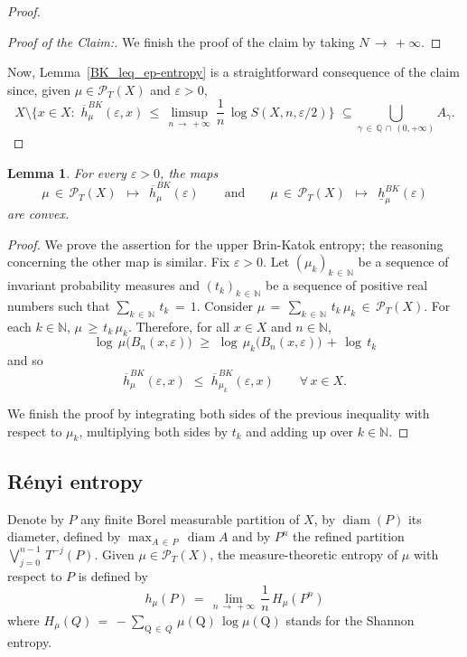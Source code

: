 \documentclass[11pt,a4paper,reqno]{amsart}
\theoremstyle{plain}
\newtheorem{lemma}[theorem]{Lemma}
\theoremstyle{definition}
\newcommand{\field}[1]{\mathbb{#1}}
\newcommand{\NN}{\field{N}}
\newcommand{\ga} {\gamma}    \newcommand{\Ga}{\Gamma}
\newcommand{\ep} {\varepsilon}
\newcommand{\vep}{\varepsilon}
\newcommand{\cP}{{\mathcal P}}
\newcommand{\diam}{\operatorname{{diam}}}
\begin{document}
\begin{proof}
\begin{proof}[Proof of the Claim:]
\noindent We finish the proof of the claim by taking $N\,\to\,+\infty$.
\end{proof}

Now, Lemma~\ref{BK_leq_ep-entropy} is a straightforward consequence of the claim since, given  $\mu\in\cP_T(X)$ and $\ep>0$, 
$$X \setminus \Big\{x \in X \colon \,\,\overline{h}^{BK}_\mu(\ep,x) \,\leq\, \limsup_{n\, \to \, +\infty}\, \frac{1}{n}\,\log S(X,n,\vep/2)\Big\} \,\, \subseteq \bigcup_{\ga \,\in \,\mathbb{Q}\,\cap\,(0,+\infty)}  A_\ga.$$
\end{proof}


\begin{lemma}\label{BK_convex}
For every $\ep>0$, the maps 
$$\mu\,\in\,\cP_T(X)\,\,\,\longmapsto\,\,\,\overline{h}_\mu^{BK}(\ep) \quad \quad \text{and} \quad \quad \mu\,\in\,\cP_T(X)\,\,\,\longmapsto\,\,\,\underline{h}_\mu^{BK}(\ep)$$
are convex. 
\end{lemma}

\begin{proof}
We prove the assertion for the upper Brin-Katok entropy; the reasoning concerning the other map is similar. Fix $\vep > 0$. Let $(\mu_k)_{k\,\in\,\NN}$ be a sequence of invariant probability measures and $(t_k)_{k\,\in\,\NN}$ be a sequence of positive real numbers such that $\sum_{k\,\in\,\NN} \,t_k\,=\,1$. Consider $\mu\,=\,\sum_{k\,\in\,\NN} \,t_k\,\mu_k\,\in\,\cP_T(X).$ For each $k\in \NN$, $\mu\,\geq\,t_k\,\mu_k$. Therefore, for all $x\in X$ and $n\in \NN$, $$\log\,\mu\big(B_n(x,\ep)\big)\,\,\geq\,\,\log\,\mu_k\big(B_n(x,\ep)\big)\,+\,\log\,t_k$$
and so
$$\overline{h}_\mu^{BK}(\ep,x)\,\,\leq\,\,\overline{h}_{\mu_k}^{BK}(\ep,x)\qquad \forall\, x\in X.$$ 
\smallskip

\noindent We finish the proof by integrating both sides of the previous inequality with respect to $\mu_k$, multiplying both sides by $t_k$ and adding up over $k\in\NN.$
\end{proof}


\subsection{Rényi entropy}
Denote by $P$ any finite Borel measurable partition of $X$, by $\diam(P)$ its diameter, defined by $\max_{A \,\in \, P} \, \diam A$ and by $P^n$ the refined partition $\bigvee_{j=0}^{n-1}\, T^{-j}(P)$. Given $\mu \in \cP_T(X)$, the measure-theoretic entropy of $\mu$ with respect to $P$ is defined by
$$h_\mu(P)\,=\,\lim_{n \, \to \, +\infty} \, \frac{1}{n}\,H_\mu(P^n)$$
where $H_\mu(Q)\,=\,-\sum_{\mathrm{Q}\,\in\,Q}\,\mu(\mathrm{Q})\,\log\mu(\mathrm{Q})$ stands for the Shannon entropy.
\end{document}
